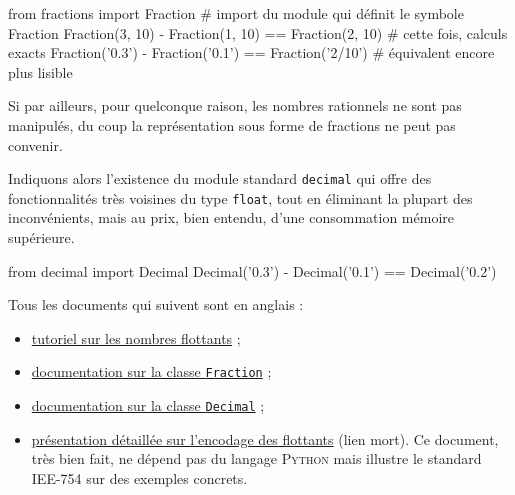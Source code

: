 \begin{idleconsole*}
	\begin{pyconsole}
		from fractions import Fraction  # import du module qui définit le symbole Fraction
		Fraction(3, 10) - Fraction(1, 10) == Fraction(2, 10)  # cette fois, calculs exacts
		Fraction('0.3') - Fraction('0.1') == Fraction('2/10')  # équivalent encore plus lisible
	\end{pyconsole}
\end{idleconsole*}

\vspace{1pt}


Si par ailleurs, pour quelconque raison, les nombres rationnels ne sont pas manipulés, du coup la représentation sous forme de fractions ne peut pas convenir. 

Indiquons alors l'existence du module standard \texttt{decimal} qui offre des fonctionnalités très voisines du type \texttt{float}, tout en éliminant la plupart des inconvénients, mais au prix, bien entendu, d'une consommation mémoire supérieure.

\begin{idleconsole}
	\begin{pyconsole}
		from decimal import Decimal
		Decimal('0.3') - Decimal('0.1') == Decimal('0.2')
	\end{pyconsole}
\end{idleconsole}

\begin{gofurther}
Tous les documents qui suivent sont en anglais :
\begin{itemize}\jazzitem
\item \href{https://docs.python.org/3/tutorial/floatingpoint.html}{tutoriel sur les nombres flottants} ;
\item \href{https://docs.python.org/3/library/fractions.html}{documentation sur la classe \texttt{Fraction}} ;
\item \href{https://docs.python.org/3/library/decimal.html}{documentation sur la classe \texttt{Decimal}} ;
\item \href{http://ww5.oxfordmathcenter.com/drupal7/node>/43}{présentation détaillée sur l'encodage des flottants} (lien mort). Ce document, très bien fait, ne dépend pas du langage \textsc{Python} mais illustre le standard \textsc{IEE-754} sur des exemples concrets.
\end{itemize}
\end{gofurther}


